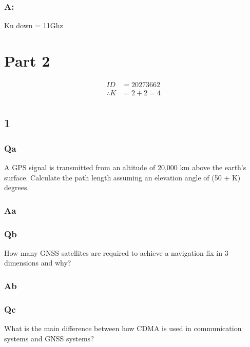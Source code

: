 \documentclass[11pt]{article}
\begin{document}
\subsubsection{A:}

Ku down = 11Ghz




\section{Part 2}\label{part2}

\begin{equation}
    \begin{split}
        ID &= 20273662\\
        \therefore K &= 2 + 2 = 4\\
    \end{split}
\end{equation}

\subsection{1}
\subsubsection{Qa}
A GPS signal is transmitted from an altitude of 20,000 km above the earth’s surface. Calculate the path length assuming an elevation angle of (50 + K) degrees.
\subsubsection{Aa}



\subsubsection{Qb}
How many GNSS satellites are required to achieve a navigation fix in 3 dimensions and why?
\subsubsection{Ab}



\subsubsection{Qc}
What is the main difference between how CDMA is used in communication systems and GNSS systems?
\end{document}
